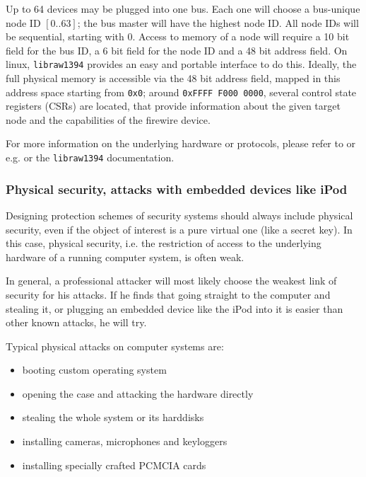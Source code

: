 Up to 64 devices may be plugged into one bus. Each one will choose a bus-unique
node ID $[0..63]$; the bus master will have the highest node ID. All node IDs
will be sequential, starting with 0. Access to memory of a node will require a
10 bit field for the bus ID, a 6 bit field for the node ID and a 48 bit address
field.  On linux, \texttt{libraw1394} provides an easy and portable interface to
do this. Ideally, the full physical memory is accessible via the 48 bit address
field, mapped in this address space starting from \texttt{0x0}; around
\texttt{0xFFFF F000 0000}, several control state registers (CSRs) are located,
that provide information about the given target node and the capabilities of the
firewire device.

For more information on the underlying hardware or protocols, please refer to
\cite{OHCIspecs:2000} or e.g. \cite{fwire_sys_arch:2222} or the
\texttt{libraw1394} documentation.



\subsubsection{Physical security, attacks with embedded devices like iPod}

Designing protection schemes of security systems should always include physical
security, even if the object of interest is a pure virtual one (like a secret
key). In this case, physical security, i.e. the restriction of access to the
underlying hardware of a running computer system, is often weak.

In general, a professional attacker will most likely choose the weakest link of
security for his attacks. If he finds that going straight to the computer and
stealing it, or plugging an embedded device like the iPod into it is easier than
other known attacks, he will try.

Typical physical attacks on computer systems are:

\begin{itemize}

	\item booting custom operating system

	\item opening the case and attacking the hardware directly

	\item stealing the whole system or its harddisks

	\item installing cameras, microphones and keyloggers

	\item installing specially crafted PCMCIA cards

\end{itemize}

